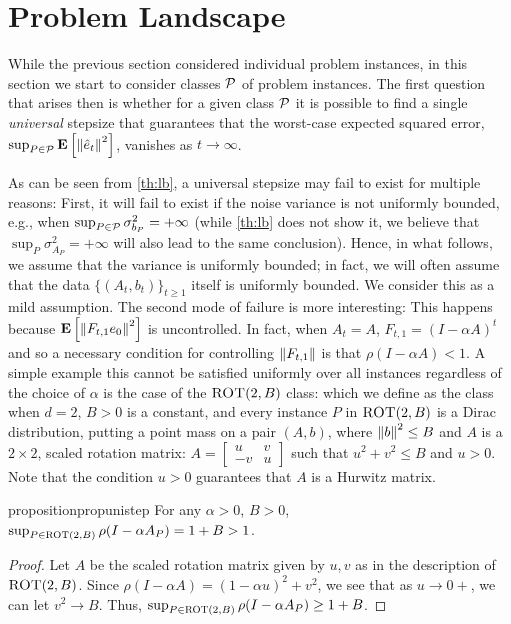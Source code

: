 \section{Problem Landscape}\label{sec:land}
While the previous section considered individual problem instances, in this section we start
to consider classes $\mathcal{P}$ of problem instances.
The first question that arises then is whether for a given class $\mathcal{P}$ it is possible to find a single
\emph{universal} stepsize that guarantees that the worst-case expected squared error,
$\sup_{P\in \mathcal{P}} \mathbf{E}\left[ \left\| \hat{e}_t\right\|^2 \right]$, vanishes as $t\to\infty$.

As can be seen from \cref{th:lb},
a universal stepsize may fail to exist for multiple reasons: 
First, it will fail to exist if the noise variance is not uniformly bounded, e.g.,
when $\sup_{P\in \mathcal{P}} \sigma^2_{b_P}=+\infty$
(while \cref{th:lb} does not show it, we believe that $\sup_{P} \sigma^2_{A_P}=+\infty$ will also
lead to the same conclusion).
Hence, in what follows, we assume that the variance is uniformly bounded; in fact, we will often
assume that the data $\{(A_t,b_t)\}_{t\ge 1}$ itself is uniformly bounded.
We consider this as a mild assumption.
The second mode of failure is more interesting: This happens because $\mathbf{E}\left[\left\| F_{t,1} e_0\right\|^2\right]$ 
is uncontrolled. In fact, when $A_t = A$, $F_{t,1} = (I-\alpha A)^t$ and so a necessary condition
for controlling $\left\| F_{t,1}\right\|$ is that $\rho(I-\alpha A)<1$.
A simple example this cannot be satisfied uniformly over all instances regardless of the choice of $\alpha$
is the case of  the $\text{\sc ROT}(2,B)$ class: 
which we define as the class when $d=2$, $B>0$ is a constant,
and every instance $P$ in $\text{\sc ROT}(2,B)$ is a Dirac distribution,
putting a point mass on a pair $(A,b)$, where $\left\| b\right\|^2\le B$ 
and $A$ is a $2\times 2$, scaled rotation matrix:
$A=\left[\begin{matrix} u &v \\ -v & u\end{matrix}\right]$ such that $u^2+v^2\leq B$ and $u>0$.
Note that the condition $u>0$ guarantees that $A$ is a Hurwitz matrix.
\begin{restatable}{proposition}{propunistep}\label{prop:unistep}
For any $\alpha>0$, $B>0$, $\sup_{P\in \text{\sc ROT}(2,B)}  \rho(I-\alpha A_P) =1+ B> 1$.
\end{restatable}
\begin{proof}
Let $A$ be the scaled rotation matrix given by $u,v$ as in the description of $\text{\sc ROT}(2,B)$.
Since $\rho(I-\alpha A)=(1-\alpha u)^2+v^2$, we see that as $u\to 0+$, we can let $v^2 \to B$.
Thus, $\sup_{P\in \text{\sc ROT}(2,B)}  \rho(I-\alpha A_P) \ge 1+B$.
\end{proof}
